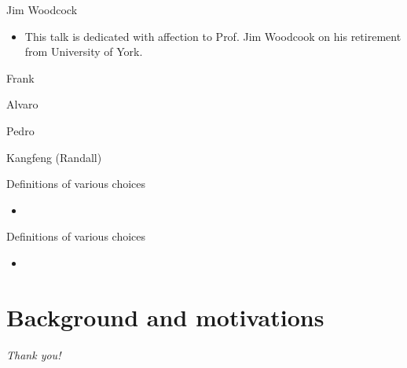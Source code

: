 \documentclass[%
    slidestop,%
    compress,%
    mathserif,%
    table,%
    usenames,%
    aspectratio=169,
    dvipsnames,%
]{beamer}%
\begin{document}
\begin{frame}{Jim Woodcock}
    \begin{itemize}
        \item This talk is dedicated with affection to Prof. Jim Woodcook on his retirement from University of York.
    \end{itemize}
    \begin{block}{Frank}

    \end{block}
    \begin{block}{Alvaro}

    \end{block}
    \begin{block}{Pedro}

    \end{block}
    \begin{block}{Kangfeng (Randall)}

    \end{block}
\end{frame}

\begin{frame}{Definitions of various choices}
    \begin{itemize}
        \item 
    \end{itemize}
\end{frame}

\begin{frame}{Definitions of various choices}
    \begin{itemize}
        \item 
    \end{itemize}
\end{frame}

\section{Background and motivations}

\begin{frame}[c]{ }
    \centering 
    \Huge
    \emph{Thank you!} \\
    \vspace{0.5em}
    \normalsize
    \color{black}{https://robostar.cs.york.ac.uk/}
\end{frame}

\newpage
%

 
\label{ch:bib} %
\end{document}
